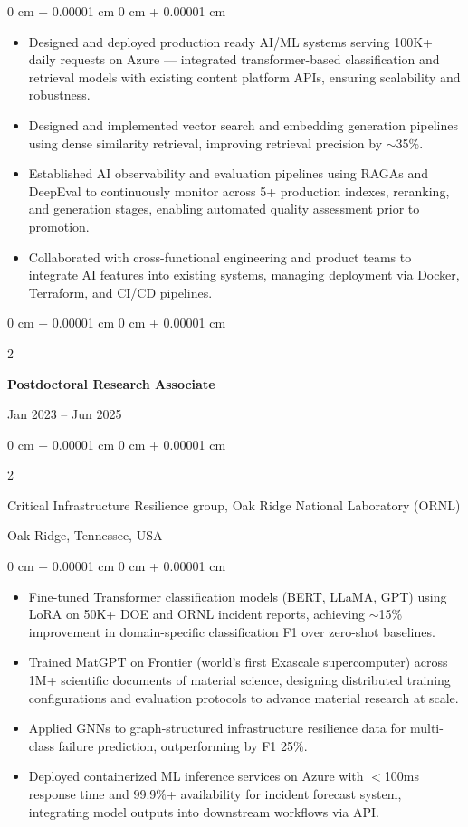 \documentclass[10pt, letterpaper]{article}
\newenvironment{highlights}{
    \begin{itemize}[
        topsep=0.10 cm,
        parsep=0.10 cm,
        partopsep=0pt,
        itemsep=0pt,
        leftmargin=0 cm + 10pt
    ]
}{
    \end{itemize}
} %
\newenvironment{onecolentry}{
    \begin{adjustwidth}{
        0 cm + 0.00001 cm
    }{
        0 cm + 0.00001 cm
    }
}{
    \end{adjustwidth}
} %
\newenvironment{twocolentry}[2][]{
    \onecolentry
    \def\secondColumn{#2}
    \setcolumnwidth{\fill, 4.5 cm}
    \begin{paracol}{2}
}{
    \switchcolumn \raggedleft \secondColumn
    \end{paracol}
    \endonecolentry
} %
\begin{document}
    \begin{onecolentry}
        \begin{highlights}
            \item Designed and deployed production ready AI/ML systems serving 100K+ daily requests on Azure — integrated transformer-based classification and retrieval models with existing content platform APIs, ensuring scalability and robustness.
            \item Designed and implemented vector search and embedding generation pipelines using dense similarity retrieval, improving retrieval precision by $\sim$35\%.
            \item Established AI observability and evaluation pipelines using RAGAs and DeepEval to continuously monitor across 5+ production indexes, reranking, and generation stages, enabling automated quality assessment prior to promotion.
            \item Collaborated with cross-functional engineering and product teams to integrate AI features into existing systems, managing deployment via Docker, Terraform, and CI/CD pipelines.
        \end{highlights}
    \end{onecolentry}

    \vspace{1mm}

    \begin{twocolentry}{Jan 2023 -- Jun 2025}
        \textbf{Postdoctoral Research Associate}
    \end{twocolentry}
    \begin{twocolentry}{Oak Ridge, Tennessee, USA}
        Critical Infrastructure Resilience group, Oak Ridge National Laboratory (ORNL)
    \end{twocolentry}
    \vspace{0.10 cm}
    \begin{onecolentry}
        \begin{highlights}

        \item Fine-tuned Transformer classification models (BERT, LLaMA, GPT) using LoRA on 50K+ DOE and ORNL incident reports, achieving $\sim$15\% improvement in domain-specific classification F1 over zero-shot baselines.
            \item Trained MatGPT on Frontier (world’s first Exascale supercomputer) across 1M+ scientific documents of material science, designing distributed training configurations and evaluation protocols to advance material research at scale.
            \item Applied GNNs to graph-structured infrastructure resilience data for multi-class failure prediction, outperforming by F1 25\%.
            \item Deployed containerized ML inference services on Azure with $<$100ms response time and 99.9\%+ availability for incident forecast system, integrating model outputs into downstream workflows via API.
            
        \end{highlights}
    \end{onecolentry}
\end{document}
